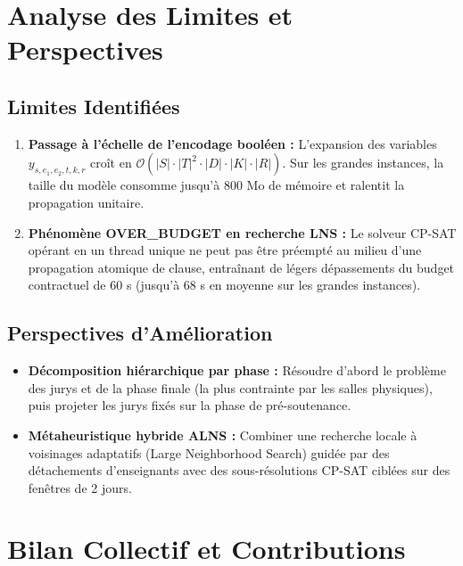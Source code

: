 \documentclass[10pt,a4paper]{article}
\begin{document}
\section{Analyse des Limites et Perspectives}

\subsection{Limites Identifiées}
\begin{enumerate}
    \item \textbf{Passage à l'échelle de l'encodage booléen :} L'expansion des variables $y_{s, e_1, e_2, t, k, r}$ croît en $\mathcal{O}(|S| \cdot |T|^2 \cdot |D| \cdot |K| \cdot |R|)$. Sur les grandes instances, la taille du modèle consomme jusqu'à 800 Mo de mémoire et ralentit la propagation unitaire.
    \item \textbf{Phénomène OVER\_BUDGET en recherche LNS :} Le solveur CP-SAT opérant en un thread unique ne peut pas être préempté au milieu d'une propagation atomique de clause, entraînant de légers dépassements du budget contractuel de 60 s (jusqu'à 68 s en moyenne sur les grandes instances).
\end{enumerate}

\subsection{Perspectives d'Amélioration}
\begin{itemize}
    \item \textbf{Décomposition hiérarchique par phase :} Résoudre d'abord le problème des jurys et de la phase finale (la plus contrainte par les salles physiques), puis projeter les jurys fixés sur la phase de pré-soutenance.
    \item \textbf{Métaheuristique hybride ALNS :} Combiner une recherche locale à voisinages adaptatifs (Large Neighborhood Search) guidée par des détachements d'enseignants avec des sous-résolutions CP-SAT ciblées sur des fenêtres de 2 jours.
\end{itemize}

\section{Bilan Collectif et Contributions}
\end{document}
